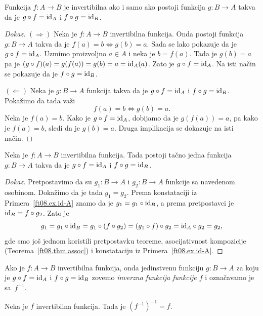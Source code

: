 \begin{THM}
  Funkcija $f : A \to B$ je invertibilna ako i samo ako postoji funkcija $g : B \to A$ takva da je
  $g \circ f = \mathrm{id}_A$ i $f \circ g = \mathrm{id}_B$.
\end{THM}
\begin{proof}[Dokaz]
  $(\Rightarrow)$
  Neka je $f : A \to B$ invertibilna funkcija. Onda postoji funkcija $g : B \to A$ takva da
  je $f(a) = b \Leftrightarrow g(b) = a$. Sada se lako pokazuje da je $g \circ f = \mathrm{id}_A$. Uzmimo proizvoljno $a \in A$
  i neka je $b = f(a)$. Tada je $g(b) = a$ pa je $(g \circ f)(a) = g(f(a)) = g(b) = a = \mathrm{id}_A(a)$. Zato je $g \circ f = \mathrm{id}_A$.
  Na isti na\v cin se pokazuje da je $f \circ g = \mathrm{id}_B$.
  
  $(\Leftarrow)$
  Neka je $g : B \to A$ funkcija takva da je $g \circ f = \mathrm{id}_A$ i $f \circ g = \mathrm{id}_B$. Poka\v zimo da tada va\v zi
  $$
    f(a) = b \Leftrightarrow g(b) = a.
  $$
  Neka je $f(a) = b$. Kako je $g \circ f = \mathrm{id}_A$, dobijamo da je
  $g(f(a)) = a$, pa kako je $f(a) = b$, sledi da je $g(b) = a$. Druga implikacija se dokazuje na isti na\v cin.
\end{proof}

\begin{THM}
  Neka je $f : A \to B$ invertibilna funkcija. Tada postoji ta\v cno jedna funkcija $g : B \to A$ takva da je
  $g \circ f = \mathrm{id}_A$ i $f \circ g = \mathrm{id}_B$.
\end{THM}
\begin{proof}[Dokaz]
  Pretpostavimo da su $g_1 : B \to A$ i $g_2 : B \to A$ funkcije sa navedenom osobinom. Doka\v zimo da je tada $g_1 = g_2$.
  Prema konstataciji iz Primera~\ref{ft08.ex.id-A} znamo da je $g_1 = g_1 \circ \mathrm{id}_B$, a prema pretpostavci je
  $\mathrm{id}_B = f \circ g_2$. Zato je
  $$
    g_1 = g_1 \circ \mathrm{id}_B = g_1 \circ (f \circ g_2) = (g_1 \circ f) \circ g_2 = \mathrm{id}_A \circ g_2 = g_2,
  $$
  gde smo jo\v s jednom koristili pretpostavku teoreme, asocijativnost kompozicije (Teorema~\ref{ft08.thm.assoc}) i
  konstataciju iz Primera~\ref{ft08.ex.id-A}.
\end{proof}

Ako je $f : A \to B$ invertibilna funkcija, onda jedinstvenu funkciju $g : B \to A$ za koju je
$g \circ f = \mathrm{id}_A$ i $f \circ g = \mathrm{id}_B$ zovemo \emph{inverzna funkcija funkcije $f$} i ozna\v cavamo je sa~$f^{-1}$.

\begin{THM}
  Neka je $f$ invertibilna funkcija. Tada je $(f^{-1})^{-1} = f$.
\end{THM}


